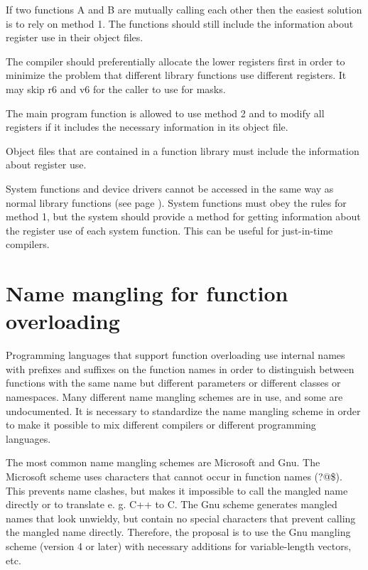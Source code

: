 \documentclass[forwardcom.tex]{subfiles}
\begin{document}
If two functions A and B are mutually calling each other then the easiest solution is to rely on method 1. The functions should still include the information about register use in their object files. 
\vspace{2mm}

The compiler should preferentially allocate the lower registers first in order to minimize the problem that different library functions use different registers. It may skip r6 and v6 for the caller to use for masks. 
\vspace{2mm}

The main program function is allowed to use method 2 and to modify all registers if it includes the necessary information in its object file. 
\vspace{2mm}

Object files that are contained in a function library must include the information about register use. 
\vspace{2mm}

System functions and device drivers cannot be accessed in the same way as normal library functions (see page \pageref{systemCallIDSystem}). System functions must obey the rules for method 1, but the system should provide a method for getting information about the register use of each system function. This can be useful for just-in-time compilers. 

\section{Name mangling for function overloading} \label{nameMangling}
Programming languages that support function overloading use internal names with prefixes and suffixes on the function names in order to distinguish between functions with the same name but different parameters or different classes or namespaces. Many different name mangling schemes are in use, and some are undocumented. It is necessary to standardize the name mangling scheme in order to make it possible to mix different compilers or different programming languages.
\vspace{2mm}

The most common name mangling schemes are Microsoft and Gnu. The Microsoft scheme uses characters that cannot occur in function names (?@\$). This prevents name clashes, but makes it impossible to call the mangled name directly or to translate e. g. C++ to C. The Gnu scheme generates mangled names that look unwieldy, but contain no special characters that prevent calling the mangled name directly. Therefore, the proposal is to use the Gnu mangling scheme (version 4 or later) with necessary additions for variable-length vectors, etc. 
\vspace{2mm}
\end{document}
